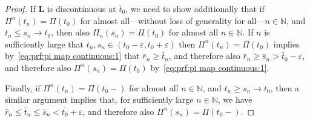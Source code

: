 \documentclass[reqno,draft]{amsart}
\numberwithin{equation}{section}
\theoremstyle{plain}
\theoremstyle{remark}
\newcommand{\N}{\mathbb{N}} %
\newcommand{\fpart}{\Pi} %
\begin{document}
\begin{proof}
    If $\boldsymbol L$ is discontinuous at $\bar{t}_0$, we need to show additionally that if $\fpart^n(t_n) = \fpart(t_0)$ for almost all---without loss of generality for all---$n\in \N$, and $t_n \le s_n \to t_0$, then also $\fpart_n(s_n) =\fpart(t_0)$ for almost all $n\in \N$. If $n$ is sufficiently large that $t_n,s_n \in (t_0-\varepsilon,t_0+\varepsilon)$ then $\fpart^n(t_n)=\fpart(t_0)$ implies by~\eqref{eq:prf:pi map continuous:1} that $\bar{r}_n \ge \bar{t}_n$, and therefore also $\bar{r}_n \ge \bar{s}_n > \bar{t}_0 - \varepsilon$, and therefore also $\fpart^n(s_n) = \fpart(t_0)$ by~\eqref{eq:prf:pi map continuous:1}.

    Finally, if $\fpart^n(t_n) = \fpart(t_0-)$ for almost all $n\in \N$, and $t_n \ge s_n \to t_0$, then a similar argument implies that, for sufficiently large $n\in \N$, we have $\bar{r}_n \le \bar{t}_n \le \bar{s}_n < \bar{t_0} + \varepsilon$, and therefore also $\fpart^n(s_n) = \fpart(t_0-)$.
\end{proof}
\end{document}
